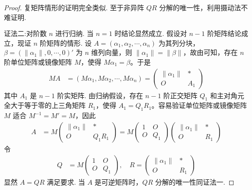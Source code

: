 \documentclass[../../main.tex]{subfiles}
\begin{document}
\begin{proof}
复矩阵情形的证明完全类似.
至于非异阵 $QR$ 分解的唯一性，利用摄动法不难证明.

{\color{blue}证法二:}对阶数 \(n\) 进行归纳. 当 \(n = 1\) 时结论显然成立. 假设对 \(n - 1\) 阶矩阵结论成立，现证 \(n\) 阶矩阵的情形. 设 \(A = (\alpha_1,\alpha_2,\cdots,\alpha_n)\) 为其列分块，\(\beta = (\|\alpha_1\|,0,\cdots,0)'\) 为 \(n\) 维列向量，则 \(\|\alpha_1\| = \|\beta\|\)，故由可知，存在 \(n\) 阶单位矩阵或镜像矩阵 \(M\)，使得 \(M\alpha_1 = \beta\)。于是
\begin{align*}
MA &= (M\alpha_1,M\alpha_2,\cdots,M\alpha_n) = 
\begin{pmatrix}
\|\alpha_1\| & * \\
O & A_1
\end{pmatrix}
\end{align*}
其中 \(A_1\) 是 \(n - 1\) 阶实矩阵. 由归纳假设，存在 \(n - 1\) 阶正交矩阵 \(Q_1\) 和主对角元全大于等于零的上三角矩阵 \(R_1\)，使得 \(A_1 = Q_1R_1\)。容易验证单位矩阵或镜像矩阵 \(M\) 适合 \(M^{-1} = M' = M\)，因此
\begin{align*}
A &= M\begin{pmatrix}
\|\alpha_1\| & * \\
O & Q_1R_1
\end{pmatrix} = M\begin{pmatrix}
1 & O \\
O & Q_1
\end{pmatrix}\begin{pmatrix}
\|\alpha_1\| & * \\
O & R_1
\end{pmatrix}
\end{align*}
令
\begin{align*}
Q &= M\begin{pmatrix}
1 & O \\
O & Q_1
\end{pmatrix},\quad R = \begin{pmatrix}
\|\alpha_1\| & * \\
O & R_1
\end{pmatrix}
\end{align*}
显然 \(A = QR\) 满足要求. 当 \(A\) 是可逆矩阵时，\(QR\) 分解的唯一性同证法一.

\end{proof}
\end{document}
